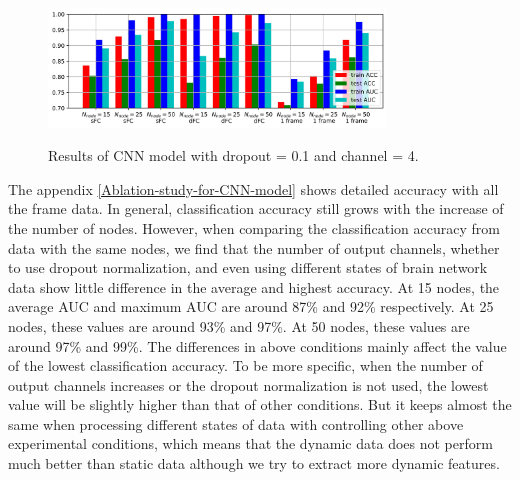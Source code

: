 \documentclass[11pt]{article}
\begin{document}
\begin{figure}[H]
    \centering
    \includegraphics[width=0.8\textwidth]{../Result/bar_channel=4_dropout=0.1.jpg} \\
    \caption{Results of CNN model with dropout = 0.1 and channel = 4.}
    \label{CNN-results}
\end{figure}

The appendix \ref{Ablation-study-for-CNN-model} shows detailed accuracy with all the frame data. In general, classification accuracy still grows with the increase of the number of nodes. However, when comparing the classification accuracy from data with the same nodes, we find that the number of output channels, whether to use dropout normalization, and even using different states of brain network data show little difference in the average and highest accuracy. At 15 nodes, the average AUC and maximum AUC are around 87\% and 92\% respectively. At 25 nodes, these values are around 93\% and 97\%. At 50 nodes, these values are around 97\% and 99\%. The differences in above conditions mainly affect the value of the lowest classification accuracy. To be more specific, when the number of output channels increases or the dropout normalization is not used, the lowest value will be slightly higher than that of other conditions. But it keeps almost the same when processing different states of data with controlling other above experimental conditions, which means that the dynamic data does not perform much better than static data although we try to extract more dynamic features.
\end{document}
